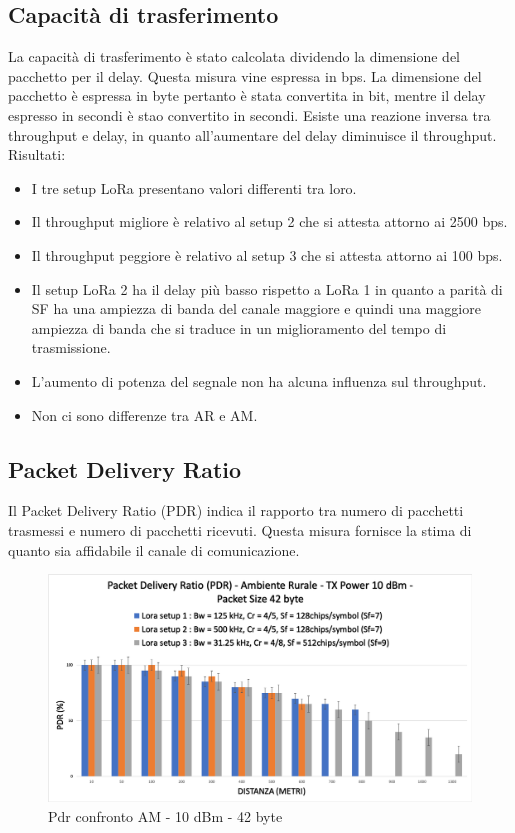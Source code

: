 \documentclass[12pt,a4paper,openright,twoside]{report}
\begin{document}
\subsection{Capacit\`a di trasferimento}
La capacit\`a di trasferimento \`e stato calcolata dividendo la dimensione del pacchetto per il delay. Questa misura vine espressa in bps.
La dimensione del pacchetto \`e espressa in byte pertanto \`e stata convertita in bit, mentre il delay espresso in secondi \`e stao convertito in secondi.
Esiste una reazione inversa tra throughput e delay, in quanto all'aumentare del delay diminuisce il throughput.
Risultati:
\begin{itemize}    
\item I tre setup LoRa presentano valori differenti tra loro.
\item Il throughput migliore \`e relativo al setup 2 che si attesta attorno ai 2500 bps.
\item Il throughput peggiore \`e relativo al setup 3 che si attesta attorno ai 100 bps.
\item Il setup LoRa 2 ha il delay pi\`u basso rispetto a LoRa 1 in quanto a parit\`a di SF ha una ampiezza di banda del canale maggiore e quindi una maggiore ampiezza di banda che si traduce in un miglioramento del tempo di trasmissione.
\item L'aumento di potenza del segnale non ha alcuna influenza sul throughput.
\item Non ci sono differenze tra AR e AM.
\end{itemize}

\subsection{Packet Delivery Ratio}
Il Packet Delivery Ratio (PDR) indica il rapporto tra numero di pacchetti trasmessi e numero di pacchetti ricevuti. Questa misura fornisce la stima di quanto sia affidabile il canale di comunicazione. 

\begin{figure}[h]                      
\begin{center} 
\includegraphics[width=\textwidth]{PDR_BAR_confronto_AR_10dBm-42byte.png}
\caption[Pdr confronto AR - 10 dBm - 42 byte]{Pdr confronto AM - 10 dBm - 42 byte}\label{fig:prima}
\end{center}
\end{figure}
\end{document}
